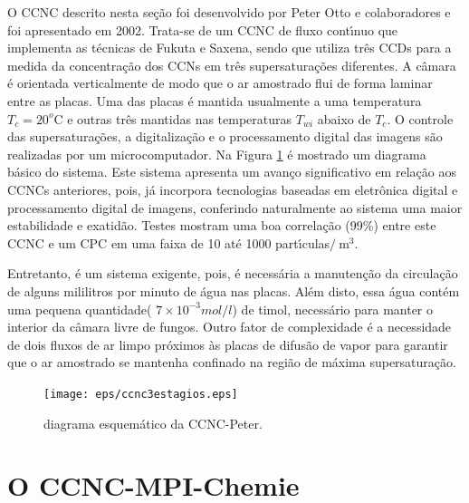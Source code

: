O CCNC descrito nesta se\c{c}\~{a}o foi desenvolvido por Peter Otto e colaboradores
\cite{Otto} e foi apresentado em 2002. Trata-se de um CCNC de fluxo
cont\'{\i}nuo que implementa as t\'{e}cnicas de Fukuta e Saxena, sendo que utiliza tr\^{e}s
CCDs para a medida da concentra\c{c}\~{a}o dos CCNs em tr\^{e}s supersatura\c{c}\~{o}es diferentes. A c\^{a}mara \'{e} orientada verticalmente de modo que o ar amostrado flui de forma laminar entre as placas. Uma das placas \'{e} mantida usualmente a uma temperatura $T_c=20^o$C e outras tr\^{e}s mantidas nas temperaturas $T_{wi}$ abaixo de $T_c$. O controle das
supersatura\c{c}\~{o}es, a digitaliza\c{c}\~{a}o e o processamento digital das imagens
s\~{a}o realizadas por um microcomputador. Na Figura \ref{ccnc3e} \'{e} mostrado
um diagrama b\'{a}sico do sistema.  Este sistema apresenta um avan\c{c}o
significativo em rela\c{c}\~{a}o aos CCNCs anteriores, pois, j\'{a} incorpora
tecnologias baseadas em eletr\^{o}nica digital e processamento digital
de imagens, conferindo naturalmente ao sistema uma maior
estabilidade e exatid\~{a}o. Testes mostram uma boa correla\c{c}\~{a}o (99\%) entre este CCNC e um CPC em uma faixa de 10 at\'{e} 1000 part\'{\i}culas$ /\ $m$^3$.

Entretanto, \'{e} um sistema exigente, pois, \'{e} necess\'{a}ria a manuten\c{c}\~{a}o da  circula\c{c}\~{a}o de alguns mililitros por minuto de \'{a}gua nas placas. Al\'{e}m disto, essa \'{a}gua cont\'{e}m uma pequena quantidade( $7\times10^{-3} mol/l$) de timol, necess\'{a}rio para manter o interior da c\^{a}mara livre de fungos. Outro fator de complexidade \'{e} a necessidade de dois fluxos de ar limpo pr\'{o}ximos \`{a}s placas de difus\~{a}o de vapor para garantir que o ar amostrado se mantenha confinado na regi\~{a}o de m\'{a}xima supersatura\c{c}\~{a}o.



\begin{figure}[!hbt]
\begin{center}
\texttt{[image: eps/ccnc3estagios.eps]}\\
\end{center}
\caption{\label{ccnc3e}\hspace{-0.1em} diagrama esquem\'{a}tico da CCNC-Peter.}
\end{figure}
\newpage


\section{O CCNC-MPI-Chemie}

